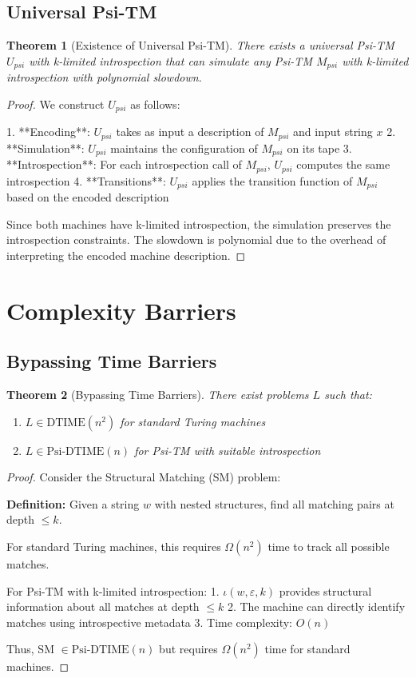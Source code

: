 \documentclass[11pt]{article}
\newtheorem{theorem}{Theorem}
\begin{document}
\subsection{Universal Psi-TM}

\begin{theorem}[Existence of Universal Psi-TM]
There exists a universal Psi-TM $U_{psi}$ with k-limited introspection that can simulate any Psi-TM $M_{psi}$ with k-limited introspection with polynomial slowdown.
\end{theorem}

\begin{proof}
We construct $U_{psi}$ as follows:

1. **Encoding**: $U_{psi}$ takes as input a description of $M_{psi}$ and input string $x$
2. **Simulation**: $U_{psi}$ maintains the configuration of $M_{psi}$ on its tape
3. **Introspection**: For each introspection call of $M_{psi}$, $U_{psi}$ computes the same introspection
4. **Transitions**: $U_{psi}$ applies the transition function of $M_{psi}$ based on the encoded description

Since both machines have k-limited introspection, the simulation preserves the introspection constraints. The slowdown is polynomial due to the overhead of interpreting the encoded machine description.
\end{proof}

\section{Complexity Barriers}

\subsection{Bypassing Time Barriers}

\begin{theorem}[Bypassing Time Barriers]
There exist problems $L$ such that:
\begin{enumerate}
\item $L \in \text{DTIME}(n^2)$ for standard Turing machines
\item $L \in \text{Psi-DTIME}(n)$ for Psi-TM with suitable introspection
\end{enumerate}
\end{theorem}

\begin{proof}
Consider the Structural Matching (SM) problem:

\textbf{Definition:} Given a string $w$ with nested structures, find all matching pairs at depth $\leq k$.

For standard Turing machines, this requires $\Omega(n^2)$ time to track all possible matches.

For Psi-TM with k-limited introspection:
1. $\iota(w, \varepsilon, k)$ provides structural information about all matches at depth $\leq k$
2. The machine can directly identify matches using introspective metadata
3. Time complexity: $O(n)$

Thus, SM $\in \text{Psi-DTIME}(n)$ but requires $\Omega(n^2)$ time for standard machines.
\end{proof}
\end{document}
